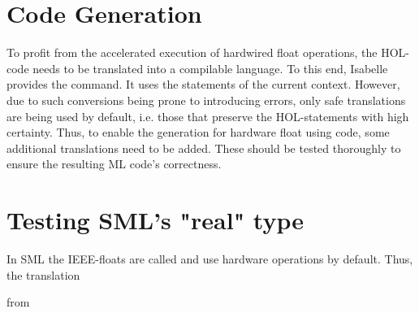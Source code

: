 \documentclass[11pt,a4paper]{article}
\begin{document}
\section{Code Generation}
To profit from the accelerated execution of hardwired float operations, the HOL-code needs to be translated into a compilable language. To this end, Isabelle provides the
command. It uses the 
statements of the current context. However, due to such conversions being prone to introducing errors, only safe translations are being used by default, i.e. those that preserve the HOL-statements with high certainty. Thus, to enable the generation for hardware float using code, some additional translations need to be added. These should be tested thoroughly to ensure the resulting ML code's correctness.

\section{Testing SML's "real" type}

In SML the IEEE-floats are called
and use hardware operations by default. Thus, the translation

from
 
\end{document}
